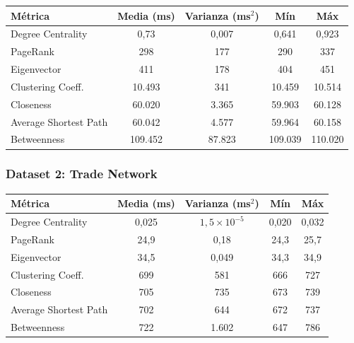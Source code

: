 \begin{center}
\begin{tabular}{lcccc}
\toprule
\textbf{Métrica} & \textbf{Media (ms)} & \textbf{Varianza (ms$^2$)} & \textbf{Mín} & \textbf{Máx} \\
\midrule
Degree Centrality     & 0{,}73      & 0{,}007    & 0{,}641   & 0{,}923  \\
PageRank              & 298         & 177        & 290       & 337      \\
Eigenvector           & 411         & 178        & 404       & 451      \\
Clustering Coeff.     & 10.493      & 341        & 10.459    & 10.514   \\
Closeness             & 60.020      & 3.365      & 59.903    & 60.128   \\
Average Shortest Path & 60.042      & 4.577      & 59.964    & 60.158   \\
Betweenness           & 109.452     & 87.823     & 109.039   & 110.020  \\
\bottomrule
\end{tabular}
\end{center}

\subsubsection*{Dataset 2: Trade Network}

\begin{center}
\begin{tabular}{lcccc}
\toprule
\textbf{Métrica} & \textbf{Media (ms)} & \textbf{Varianza (ms$^2$)} & \textbf{Mín} & \textbf{Máx} \\
\midrule
Degree Centrality     & 0{,}025 & $1{,}5\times10^{-5}$ & 0{,}020 & 0{,}032 \\
PageRank              & 24{,}9  & 0{,}18               & 24{,}3  & 25{,}7  \\
Eigenvector           & 34{,}5  & 0{,}049              & 34{,}3  & 34{,}9  \\
Clustering Coeff.     & 699     & 581                  & 666     & 727     \\
Closeness             & 705     & 735                  & 673     & 739     \\
Average Shortest Path & 702     & 644                  & 672     & 737     \\
Betweenness           & 722     & 1.602                & 647     & 786     \\
\bottomrule
\end{tabular}
\end{center}

